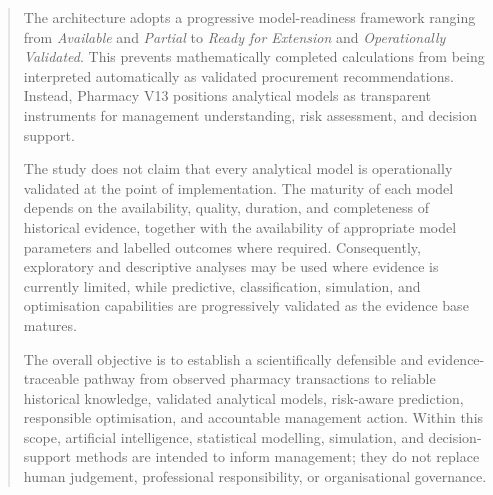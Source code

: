 \documentclass[12pt]{article}
\begin{document}
\begin{abstract}
The architecture adopts a progressive model-readiness framework ranging from
\textit{Available} and \textit{Partial} to \textit{Ready for Extension} and
\textit{Operationally Validated}. This prevents mathematically completed
calculations from being interpreted automatically as validated procurement
recommendations. Instead, Pharmacy V13 positions analytical models as
transparent instruments for management understanding, risk assessment, and
decision support.

The study does not claim that every analytical model is operationally
validated at the point of implementation. The maturity of each model depends
on the availability, quality, duration, and completeness of historical
evidence, together with the availability of appropriate model parameters and
labelled outcomes where required. Consequently, exploratory and descriptive
analyses may be used where evidence is currently limited, while predictive,
classification, simulation, and optimisation capabilities are progressively
validated as the evidence base matures.

The overall objective is to establish a scientifically defensible and
evidence-traceable pathway from observed pharmacy transactions to reliable
historical knowledge, validated analytical models, risk-aware prediction,
responsible optimisation, and accountable management action. Within this
scope, artificial intelligence, statistical modelling, simulation, and
decision-support methods are intended to inform management; they do not
replace human judgement, professional responsibility, or organisational
governance.

\end{abstract}
\end{document}

